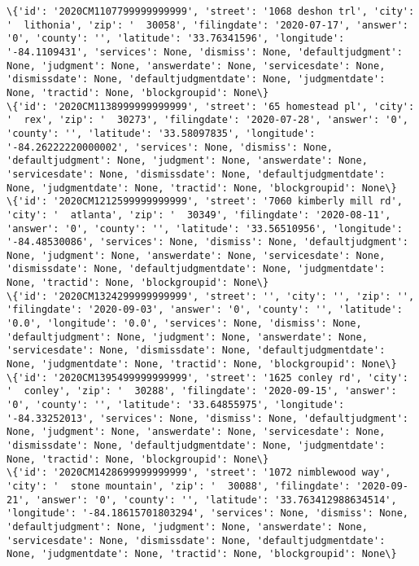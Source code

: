 \documentclass[11pt]{article}
\begin{document}
\begin{Verbatim}[commandchars=\\\{\}]
\{'id': '2020CM1107799999999999', 'street': '1068 deshon trl', 'city': '  lithonia', 'zip': '  30058', 'filingdate': '2020-07-17', 'answer': '0', 'county': '', 'latitude': '33.76341596', 'longitude': '-84.1109431', 'services': None, 'dismiss': None, 'defaultjudgment': None, 'judgment': None, 'answerdate': None, 'servicesdate': None, 'dismissdate': None, 'defaultjudgmentdate': None, 'judgmentdate': None, 'tractid': None, 'blockgroupid': None\}
\{'id': '2020CM1138999999999999', 'street': '65 homestead pl', 'city': '  rex', 'zip': '  30273', 'filingdate': '2020-07-28', 'answer': '0', 'county': '', 'latitude': '33.58097835', 'longitude': '-84.26222220000002', 'services': None, 'dismiss': None, 'defaultjudgment': None, 'judgment': None, 'answerdate': None, 'servicesdate': None, 'dismissdate': None, 'defaultjudgmentdate': None, 'judgmentdate': None, 'tractid': None, 'blockgroupid': None\}
\{'id': '2020CM1212599999999999', 'street': '7060 kimberly mill rd', 'city': '  atlanta', 'zip': '  30349', 'filingdate': '2020-08-11', 'answer': '0', 'county': '', 'latitude': '33.56510956', 'longitude': '-84.48530086', 'services': None, 'dismiss': None, 'defaultjudgment': None, 'judgment': None, 'answerdate': None, 'servicesdate': None, 'dismissdate': None, 'defaultjudgmentdate': None, 'judgmentdate': None, 'tractid': None, 'blockgroupid': None\}
\{'id': '2020CM1324299999999999', 'street': '', 'city': '', 'zip': '', 'filingdate': '2020-09-03', 'answer': '0', 'county': '', 'latitude': '0.0', 'longitude': '0.0', 'services': None, 'dismiss': None, 'defaultjudgment': None, 'judgment': None, 'answerdate': None, 'servicesdate': None, 'dismissdate': None, 'defaultjudgmentdate': None, 'judgmentdate': None, 'tractid': None, 'blockgroupid': None\}
\{'id': '2020CM1395499999999999', 'street': '1625 conley rd', 'city': '  conley', 'zip': '  30288', 'filingdate': '2020-09-15', 'answer': '0', 'county': '', 'latitude': '33.64855975', 'longitude': '-84.33252013', 'services': None, 'dismiss': None, 'defaultjudgment': None, 'judgment': None, 'answerdate': None, 'servicesdate': None, 'dismissdate': None, 'defaultjudgmentdate': None, 'judgmentdate': None, 'tractid': None, 'blockgroupid': None\}
\{'id': '2020CM1428699999999999', 'street': '1072 nimblewood way', 'city': '  stone mountain', 'zip': '  30088', 'filingdate': '2020-09-21', 'answer': '0', 'county': '', 'latitude': '33.763412988634514', 'longitude': '-84.18615701803294', 'services': None, 'dismiss': None, 'defaultjudgment': None, 'judgment': None, 'answerdate': None, 'servicesdate': None, 'dismissdate': None, 'defaultjudgmentdate': None, 'judgmentdate': None, 'tractid': None, 'blockgroupid': None\}

\end{Verbatim}
\end{document}
